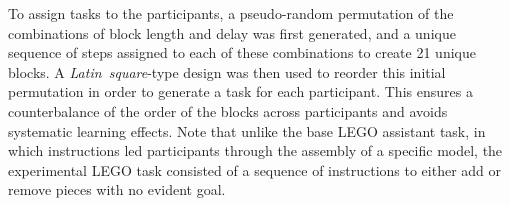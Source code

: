 \documentclass[10pt,letterpaper]{article}
\providecommand{\DIFaddtex}[1]{#1} %
\providecommand{\DIFdeltex}[1]{} %
\providecommand{\DIFaddbegin}{\protect\color{blue}} %
\providecommand{\DIFaddend}{\protect\color{black}} %
\providecommand{\DIFdelbegin}{\protect\color{red}} %
\providecommand{\DIFdelend}{\protect\color{black}} %
\providecommand{\DIFadd}[1]{\texorpdfstring{\DIFaddtex{#1}}{#1}} %
\providecommand{\DIFdel}[1]{\texorpdfstring{\DIFdeltex{#1}}{}} %
\newcommand{\DIFscaledelfig}{0.5}
\newlength{\DIFdelgraphicswidth} %
\newlength{\DIFdelgraphicsheight} %
\newcommand{\DIFaddincludegraphics}[2][]{{\color{blue}\fbox{\DIFOincludegraphics[#1]{#2}}}} %
\newcommand{\DIFdelincludegraphics}[2][]{%
\sbox{\DIFdelgraphicsbox}{\DIFOincludegraphics[#1]{#2}}%
\settoboxwidth{\DIFdelgraphicswidth}{\DIFdelgraphicsbox} %
\settoboxtotalheight{\DIFdelgraphicsheight}{\DIFdelgraphicsbox} %
\scalebox{\DIFscaledelfig}{%
\parbox[b]{\DIFdelgraphicswidth}{\usebox{\DIFdelgraphicsbox}\\[-\baselineskip] \rule{\DIFdelgraphicswidth}{0em}}\llap{\resizebox{\DIFdelgraphicswidth}{\DIFdelgraphicsheight}{%
\setlength{\unitlength}{\DIFdelgraphicswidth}%
\begin{picture}(1,1)%
\thicklines\linethickness{2pt} %
{\color[rgb]{1,0,0}\put(0,0){\framebox(1,1){}}}%
{\color[rgb]{1,0,0}\put(0,0){\line( 1,1){1}}}%
{\color[rgb]{1,0,0}\put(0,1){\line(1,-1){1}}}%
\end{picture}%
}\hspace*{3pt}}} %
} %
\DeclareRobustCommand{\DIFaddbegin}{\DIFOaddbegin \let\includegraphics\DIFaddincludegraphics} %
\DeclareRobustCommand{\DIFaddend}{\DIFOaddend \let\includegraphics\DIFOincludegraphics} %
\DeclareRobustCommand{\DIFdelbegin}{\DIFOdelbegin \let\includegraphics\DIFdelincludegraphics} %
\DeclareRobustCommand{\DIFdelend}{\DIFOaddend \let\includegraphics\DIFOincludegraphics} %
\begin{document}
\DIFdelend To assign tasks to the participants, a pseudo-random permutation of the combinations of block length and delay was first generated, and a unique sequence of steps assigned to each of these combinations to create 21 unique blocks.
A \emph{Latin\DIFaddbegin \DIFadd{~}\DIFaddend square}-type design was then used to reorder this initial permutation in order to generate a task for each participant.
This ensures a counterbalance of the order of the blocks across participants and avoids systematic learning effects. 
\DIFdelbegin \DIFdel{The design rotates the block types (as defined by length and delay) across participants so that each type is tested in each ordinal position, but it only coarsely samples from the \( 21 \times 20 \) possible sequences from one block type to another.
}\DIFdelend %
Note that unlike the base LEGO assistant task, in which instructions led participants through the assembly of a specific model, the experimental LEGO task consisted of a sequence of instructions \DIFdelbegin \DIFdel{with no evident goal.
Users were directed }\DIFdelend to either add \DIFdelbegin \DIFdel{a piece to the ongoing model or to remove a piece, and blocks were designed in such as way so as to ensure that the transitions between them were invisible to the user. 
}\DIFdelend \DIFaddbegin \DIFadd{or remove pieces with no evident goal.
}\DIFaddend 

\DIFdelbegin \DIFdel{In this paper we will thus consider blocks to be our basic element of study, and most aggregations will be done at this level (with a few exceptions).
For this, we will need additional definitions:
}\DIFdelend %

\DIFdelbegin %
\DIFdel{We will refer to the delay of a block as the delay applied to every frame of every step in that block.
}%
\DIFdelend %
\end{document}
